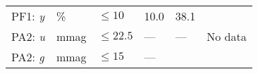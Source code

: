 \documentclass[DM,lsstdraft,toc]{lsstdoc}
\begin{document}
\begin{longtable}[]{@{}llllll@{}}
\begin{minipage}[t]{0.14\columnwidth}
PF1: \emph{y}\strut
\end{minipage} & \begin{minipage}[t]{0.06\columnwidth}\raggedright\strut
\%\strut
\end{minipage} & \begin{minipage}[t]{0.17\columnwidth}\raggedright\strut
\(\leq 10\)\strut
\end{minipage} & \begin{minipage}[t]{0.17\columnwidth}\raggedright\strut
10.0\strut
\end{minipage} & \begin{minipage}[t]{0.12\columnwidth}\raggedright\strut
38.1\strut
\end{minipage} & \begin{minipage}[t]{0.17\columnwidth}\raggedright\strut
\strut
\end{minipage}\tabularnewline
\begin{minipage}[t]{0.14\columnwidth}\raggedright\strut
PA2: \emph{u}\strut
\end{minipage} & \begin{minipage}[t]{0.06\columnwidth}\raggedright\strut
mmag\strut
\end{minipage} & \begin{minipage}[t]{0.17\columnwidth}\raggedright\strut
\(\leq 22.5\)\strut
\end{minipage} & \begin{minipage}[t]{0.17\columnwidth}\raggedright\strut
---\strut
\end{minipage} & \begin{minipage}[t]{0.12\columnwidth}\raggedright\strut
---\strut
\end{minipage} & \begin{minipage}[t]{0.17\columnwidth}\raggedright\strut
No data\strut
\end{minipage}\tabularnewline
\begin{minipage}[t]{0.14\columnwidth}\raggedright\strut
PA2: \emph{g}\strut
\end{minipage} & \begin{minipage}[t]{0.06\columnwidth}\raggedright\strut
mmag\strut
\end{minipage} & \begin{minipage}[t]{0.17\columnwidth}\raggedright\strut
\(\leq 15\)\strut
\end{minipage} & \begin{minipage}[t]{0.17\columnwidth}\raggedright\strut
---\strut
\end{minipage} & \begin{minipage}[t]{0.12\columnwidth}\raggedright\strut

\end{minipage}
\end{longtable}
\end{document}
